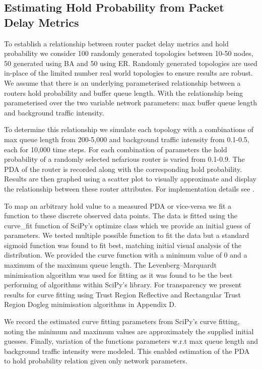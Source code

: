   \subsection{Estimating Hold Probability from Packet Delay Metrics}
  \label{ssec:pdatoholdprob}
  To establish a relationship between router packet delay metrics and hold probability we  consider 100 randomly generated topologies between 10-50 nodes, 50 generated using BA and 50 using ER. Randomly generated topologies are used in-place of the limited number real world topologies to ensure results are robust. We assume that there is an underlying parameterised relationship between a routers hold probability and buffer queue length. With the relationship being parameterised over the two variable network parameters: max buffer queue length and background traffic intensity.\par
  To determine this relationship we simulate each topology with a combinations of max queue length from  200-5,000 and background traffic intensity from 0.1-0.5, each for 10,000 time steps. For each combination of parameters the hold probability of a randomly selected nefarious router is varied from 0.1-0.9. The PDA of the router is recorded along with the corresponding hold probability. Results are then graphed using a scatter plot to visually approximate and display the relationship between these router attributes. For implementation details see \cite{sylvester_millar_real_2021}.\par
  To map an arbitrary hold value to a measured PDA or vice-versa we fit a function to these discrete observed data points. The data is fitted using the curve\_fit function of SciPy's optimize class which we provide an initial guess of parameters. We tested multiple possible function to fit the data but a standard sigmoid function was found to fit best, matching initial visual analysis of the distribution. We provided the curve function with a minimum value of 0 and a maximum of the maximum queue length. The Levenberg–Marquardt minimisation algorithm was used for fitting as it was found to be the best performing of algorithms within SciPy's library. For transparency we present results for curve fitting using Trust Region Reflective and Rectangular Trust Region Dogleg minimisation algorithms in Appendix D.\par
  We record the estimated curve fitting parameters from SciPy's curve fitting, noting the minimum and maximum values are approximately the supplied initial guesses. Finally, variation of the functions parameters w.r.t max queue length and background traffic intensity were modeled. This enabled estimation of the PDA to hold probability relation given only network parameters.\par
